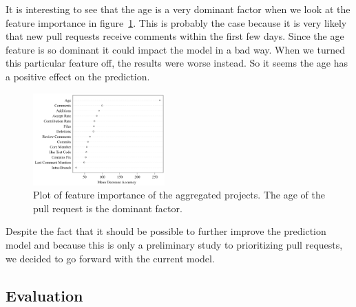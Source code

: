It is interesting to see that the age is a very dominant factor when we look at the feature importance in figure~\ref{fig:feature-importance}.
This is probably the case because it is very likely that new pull requests receive comments within the first few days.
Since the age feature is so dominant it could impact the model in a bad way.
When we turned this particular feature off, the results were worse instead.
So it seems the age has a positive effect on the prediction.

\begin{figure}
  \centering
  \includegraphics[width=0.45\textwidth]{../figs/mean-decrease-accuracy.pdf}
  \caption[Plot of feature importance]
   {Plot of feature importance of the aggregated projects. The age of the pull request is the dominant factor.}
  \label{fig:feature-importance}
\end{figure}

Despite the fact that it should be possible to further improve the prediction model and because this is only a preliminary study to prioritizing pull requests, we decided to go forward with the current model.

\subsection{Evaluation}
\label{sec:evaluation}

